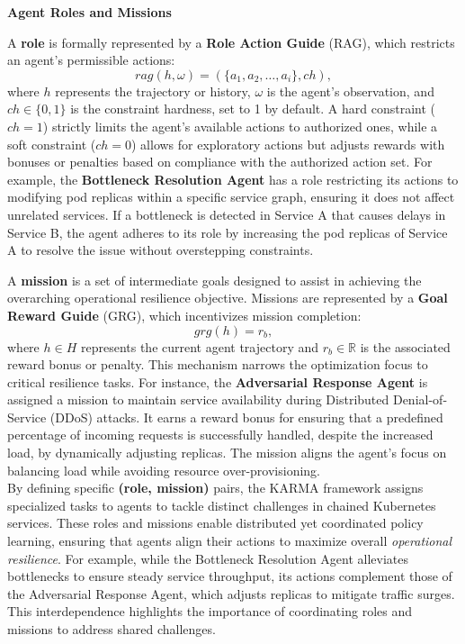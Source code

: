 \documentclass[conference]{IEEEtran}
\begin{document}
\noindent \textbf{Agent Roles and Missions}

A \textbf{role} is formally represented by a \textbf{Role Action Guide} (RAG), which restricts an agent's permissible actions:
$$
rag(h, \omega) = (\{a_1, a_2, \dots, a_i\}, ch),
$$
where \(h\) represents the trajectory or history, \(\omega\) is the agent's observation, and \(ch \in \{0,1\}\) is the constraint hardness, set to 1 by default. A hard constraint (\(ch = 1\)) strictly limits the agent's available actions to authorized ones, while a soft constraint (\(ch = 0\)) allows for exploratory actions but adjusts rewards with bonuses or penalties based on compliance with the authorized action set. For example, the \textbf{Bottleneck Resolution Agent} has a role restricting its actions to modifying pod replicas within a specific service graph, ensuring it does not affect unrelated services. If a bottleneck is detected in Service A that causes delays in Service B, the agent adheres to its role by increasing the pod replicas of Service A to resolve the issue without overstepping constraints.

A \textbf{mission} is a set of intermediate goals designed to assist in achieving the overarching operational resilience objective. Missions are represented by a \textbf{Goal Reward Guide} (GRG), which incentivizes mission completion:
$$
grg(h) = r_b,
$$
where \(h \in H\) represents the current agent trajectory and \(r_b \in \mathbb{R}\) is the associated reward bonus or penalty. This mechanism narrows the optimization focus to critical resilience tasks. For instance, the \textbf{Adversarial Response Agent} is assigned a mission to maintain service availability during Distributed Denial-of-Service (DDoS) attacks. It earns a reward bonus for ensuring that a predefined percentage of incoming requests is successfully handled, despite the increased load, by dynamically adjusting replicas. The mission aligns the agent's focus on balancing load while avoiding resource over-provisioning.\\

By defining specific \textbf{(role, mission)} pairs, the KARMA framework assigns specialized tasks to agents to tackle distinct challenges in chained Kubernetes services. These roles and missions enable distributed yet coordinated policy learning, ensuring that agents align their actions to maximize overall \textit{operational resilience}. For example, while the Bottleneck Resolution Agent alleviates bottlenecks to ensure steady service throughput, its actions complement those of the Adversarial Response Agent, which adjusts replicas to mitigate traffic surges. This interdependence highlights the importance of coordinating roles and missions to address shared challenges.
\end{document}
